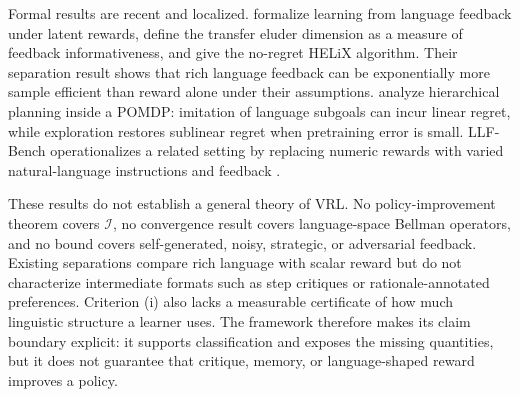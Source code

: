 Formal results are recent and localized. \citet{xu2025formalizing} formalize learning from language feedback under latent rewards, define the transfer eluder dimension as a measure of feedback informativeness, and give the no-regret HELiX algorithm. Their separation result shows that rich language feedback can be exponentially more sample efficient than reward alone under their assumptions. \citet{he2024words} analyze hierarchical planning inside a POMDP: imitation of language subgoals can incur linear regret, while exploration restores sublinear regret when pretraining error is small. LLF-Bench operationalizes a related setting by replacing numeric rewards with varied natural-language instructions and feedback \citep{cheng2023llfbench}.

These results do not establish a general theory of VRL. No policy-improvement theorem covers $\mathcal{I}$, no convergence result covers language-space Bellman operators, and no bound covers self-generated, noisy, strategic, or adversarial feedback. Existing separations compare rich language with scalar reward but do not characterize intermediate formats such as step critiques or rationale-annotated preferences. Criterion (i) also lacks a measurable certificate of how much linguistic structure a learner uses. The framework therefore makes its claim boundary explicit: it supports classification and exposes the missing quantities, but it does not guarantee that critique, memory, or language-shaped reward improves a policy.
